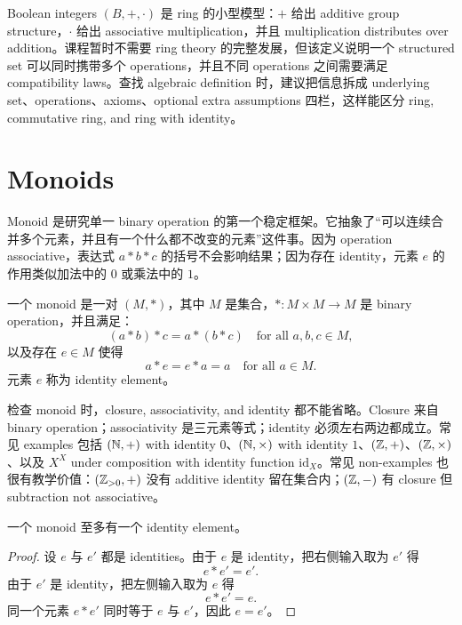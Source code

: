\begin{explanation}
Boolean integers \((B,+,\cdot)\) 是 ring 的小型模型：\(+\) 给出 additive group structure，\(\cdot\) 给出 associative multiplication，并且 multiplication distributes over addition。课程暂时不需要 ring theory 的完整发展，但该定义说明一个 structured set 可以同时携带多个 operations，并且不同 operations 之间需要满足 compatibility laws。查找 algebraic definition 时，建议把信息拆成 underlying set、operations、axioms、optional extra assumptions 四栏，这样能区分 ring, commutative ring, and ring with identity。
\end{explanation}

\section{Monoids}

Monoid 是研究单一 binary operation 的第一个稳定框架。它抽象了“可以连续合并多个元素，并且有一个什么都不改变的元素”这件事。因为 operation associative，表达式 \(a*b*c\) 的括号不会影响结果；因为存在 identity，元素 \(e\) 的作用类似加法中的 \(0\) 或乘法中的 \(1\)。

\begin{definition}[monoid]
一个 monoid 是一对 \((M,*)\)，其中 \(M\) 是集合，\(*:M\times M\to M\) 是 binary operation，并且满足：
\[
  (a*b)*c=a*(b*c)\quad\text{for all }a,b,c\in M,
\]
以及存在 \(e\in M\) 使得
\[
  a*e=e*a=a\quad\text{for all }a\in M.
\]
元素 \(e\) 称为 identity element。
\end{definition}

检查 monoid 时，closure, associativity, and identity 都不能省略。Closure 来自 binary operation；associativity 是三元素等式；identity 必须左右两边都成立。常见 examples 包括 \((\mathbb{N},+)\) with identity \(0\)、\((\mathbb{N},\times)\) with identity \(1\)、\((\mathbb{Z},+)\)、\((\mathbb{Z},\times)\)、以及 \(X^X\) under composition with identity function \(\mathrm{id}_X\)。常见 non-examples 也很有教学价值：\((\mathbb{Z}_{>0},+)\) 没有 additive identity 留在集合内；\((\mathbb{Z},-)\) 有 closure 但 subtraction not associative。

\begin{proposition}
一个 monoid 至多有一个 identity element。
\end{proposition}

\begin{proof}
设 \(e\) 与 \(e'\) 都是 identities。由于 \(e\) 是 identity，把右侧输入取为 \(e'\) 得
\[
  e*e'=e'.
\]
由于 \(e'\) 是 identity，把左侧输入取为 \(e\) 得
\[
  e*e'=e.
\]
同一个元素 \(e*e'\) 同时等于 \(e\) 与 \(e'\)，因此 \(e=e'\)。
\end{proof}

